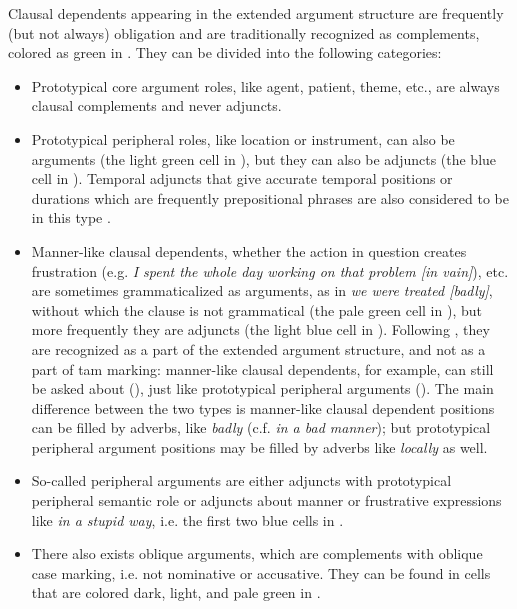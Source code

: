 \documentclass[UTF8, a4paper, oneside, scheme=plain, 12pt]{ctexbook}
\newcommand*{\citesec}[1]{\S~{#1}}
\newcommand{\form}[1]{\emph{#1}}
\begin{document}
Clausal dependents appearing in the extended argument structure 
are frequently (but not always) obligation
and are traditionally recognized as complements, 
colored as green in .
They can be divided into the following categories: 
\begin{itemize}
    \item Prototypical core argument roles, 
    like agent, patient, theme, etc.,
    are always clausal complements and never adjuncts.
    \item Prototypical peripheral roles, like location or instrument, can also be arguments
    (the light green cell in ),
    but they can also be adjuncts
    (the blue cell in ).
    Temporal adjuncts that give accurate temporal positions or durations 
    which are frequently prepositional phrases 
    are also considered to be in this type
    \citep[\citesec{1.5}]{cinque1999adverbs}. 

    \item Manner-like clausal dependents, whether the action in question creates frustration 
    (e.g. \form{I spent the whole day working on that problem [in vain]}), etc.
    are sometimes grammaticalized as arguments,
    as in \form{we were treated [badly]},
    without which the clause is not grammatical
    (the pale green cell in ),
    but more frequently they are adjuncts
    (the light blue cell in ).
    Following \citet[\citesec{1.5}]{cinque1999adverbs},
    they are recognized as a part of the extended argument structure, 
    and not as a part of \acs{tam} marking:
    manner-like clausal dependents, for example,  
    can still be asked about (), 
    just like prototypical peripheral arguments (). 
    The main difference between the two types 
    is manner-like clausal dependent positions can be filled by adverbs, like 
    \form{badly} (c.f. \form{in a bad manner});
    but prototypical peripheral argument positions may be filled 
    by adverbs like \form{locally} as well.

    \item So-called peripheral arguments
    are either adjuncts with prototypical peripheral semantic role
    or adjuncts about manner or frustrative expressions like \form{in a stupid way},
    i.e. the first two blue cells in .
    \item There also exists oblique arguments,
    which are complements with oblique case marking, i.e. not nominative or accusative.
    They can be found in cells that are colored dark, light, and pale green in .
\end{itemize}
\end{document}
